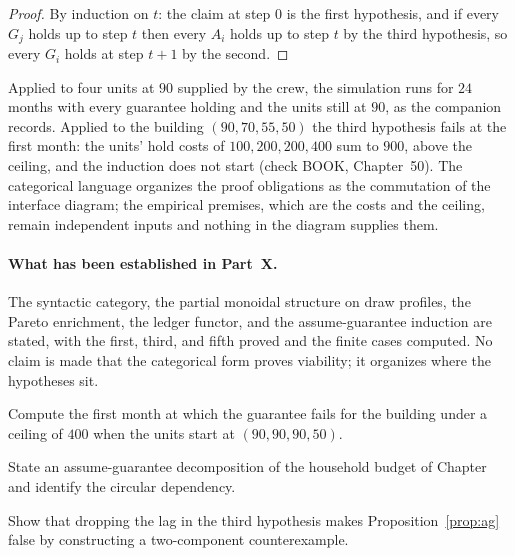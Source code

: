 \begin{proof}
By induction on $t$: the claim at step $0$ is the first hypothesis, and if every $G_j$ holds up to step $t$ then every $A_i$ holds up to step $t$ by the third hypothesis, so every $G_i$ holds at step $t+1$ by the second.
\end{proof}

Applied to four units at $90$ supplied by the crew, the simulation runs for $24$ months with every guarantee holding and the units still at $90$, as the companion records. Applied to the building $(90,70,55,50)$ the third hypothesis fails at the first month: the units' hold costs of $100,200,200,400$ sum to $900$, above the ceiling, and the induction does not start (check BOOK, Chapter~50). The categorical language organizes the proof obligations as the commutation of the interface diagram; the empirical premises, which are the costs and the ceiling, remain independent inputs and nothing in the diagram supplies them.

\paragraph{What has been established in Part~X.} The syntactic category, the partial monoidal structure on draw profiles, the Pareto enrichment, the ledger functor, and the assume-guarantee induction are stated, with the first, third, and fifth proved and the finite cases computed. No claim is made that the categorical form proves viability; it organizes where the hypotheses sit.

\begin{exercise}Compute the first month at which the guarantee fails for the building under a ceiling of $400$ when the units start at $(90,90,90,50)$.\end{exercise}
\begin{exercise}State an assume-guarantee decomposition of the household budget of Chapter~ and identify the circular dependency.\end{exercise}
\begin{exercise}Show that dropping the lag in the third hypothesis makes Proposition~\ref{prop:ag} false by constructing a two-component counterexample.\end{exercise}
